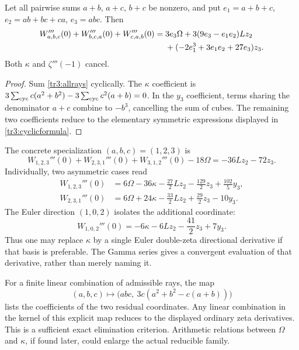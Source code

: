 \begin{corollary}\label{tr3:cyclic}
Let all pairwise sums $a+b$, $a+c$, $b+c$ be nonzero, and put
$e_1=a+b+c$, $e_2=ab+bc+ca$, $e_3=abc$.  Then
\begin{align}\label{tr3:cyclicformula}
 W_{a,b,c}'''(0)+W_{b,c,a}'''(0)+W_{c,a,b}'''(0)
 ={}&3e_3\Omega+3(9e_3-e_1e_2)Lz_2\notag\\
 &+(-2e_1^3+3e_1e_2+27e_3)z_3.
\end{align}
Both $\kappa$ and $\zeta'''(-1)$ cancel.
\end{corollary}

\begin{proof}
Sum \eqref{tr3:allrays} cyclically.  The $\kappa$ coefficient is
$3\sum_{\rm cyc}c(a^2+b^2)-3\sum_{\rm cyc}c^2(a+b)=0$.
In the $y_3$ coefficient, terms sharing the denominator $a+c$ combine
to $-b^3$, cancelling the sum of cubes.  The remaining two
coefficients reduce to the elementary symmetric expressions displayed
in \eqref{tr3:cyclicformula}.
\end{proof}

The concrete specialization $(a,b,c)=(1,2,3)$ is
\[
 W_{1,2,3}'''(0)+W_{2,3,1}'''(0)+W_{3,1,2}'''(0)-18\Omega
       =-36Lz_2-72z_3.
\]
Individually, two asymmetric cases read
\begin{align*}
 W_{1,2,3}'''(0)&=6\Omega-36\kappa
                -\frac{27}{2}Lz_2-\frac{129}{2}z_3+\frac{102}{5}y_3,\\
 W_{2,3,1}'''(0)&=6\Omega+24\kappa
                -\frac{33}{2}Lz_2+\frac{29}{2}z_3-10y_3.
\end{align*}
The Euler direction $(1,0,2)$ isolates the additional coordinate:
\begin{equation}\label{tr3:kappaisolate}
 W_{1,0,2}'''(0)=-6\kappa-6Lz_2-\frac{41}{2}z_3+7y_3.
\end{equation}
Thus one may replace $\kappa$ by a single Euler double-zeta directional
derivative if that basis is preferable.  The Gamma series gives a
convergent evaluation of that derivative, rather than merely naming it.

For a finite linear combination of admissible rays, the map
\[
 (a,b,c)\longmapsto
 \bigl(abc,\ 3c(a^2+b^2-c(a+b))\bigr)
\]
lists the coefficients of the two residual coordinates.  Any linear
combination in the kernel of this explicit map reduces to the displayed
ordinary zeta derivatives.  This is a sufficient exact elimination
criterion.  Arithmetic relations between $\Omega$ and $\kappa$, if
found later, could enlarge the actual reducible family.

